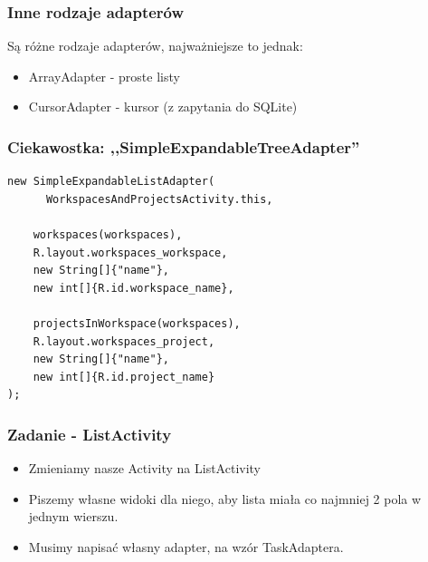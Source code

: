 \documentclass{beamer}
\begin{document}
\begin{frame}\frametitle{Inne rodzaje adapterów}
Są różne rodzaje adapterów, najważniejsze to jednak:
\begin{itemize}
 \item ArrayAdapter - proste listy
 \item CursorAdapter - kursor (z zapytania do SQLite)
\end{itemize}
\end{frame}

\begin{frame}[fragile]\frametitle{Ciekawostka: ,,\textbf{SimpleExpandableTreeAdapter}''}
\begin{lstlisting} 
new SimpleExpandableListAdapter(
      WorkspacesAndProjectsActivity.this,

    workspaces(workspaces),
    R.layout.workspaces_workspace,
    new String[]{"name"},
    new int[]{R.id.workspace_name},

    projectsInWorkspace(workspaces),
    R.layout.workspaces_project,
    new String[]{"name"},
    new int[]{R.id.project_name}
);
\end{lstlisting}

\end{frame}


\begin{frame}\frametitle{Zadanie - ListActivity}
\begin{itemize}
 \item Zmieniamy nasze Activity na ListActivity
 \pause \item Piszemy własne widoki dla niego, aby lista miała co najmniej 2 pola w jednym wierszu.
 \pause \item Musimy napisać własny adapter, na wzór TaskAdaptera.
\end{itemize}

\end{frame}
\end{document}
